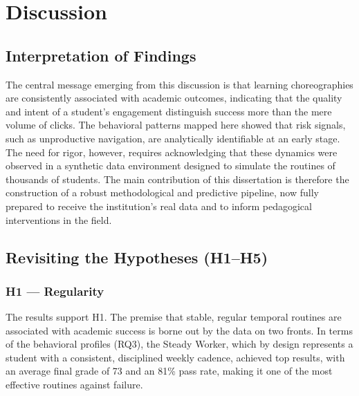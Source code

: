 \chapter{Discussion}
\label{chap:discussion}


\section{Interpretation of Findings}
\label{sec:interpretation}
The central message emerging from this discussion is that learning choreographies are consistently associated with academic outcomes, indicating that the quality and intent of a student's engagement distinguish success more than the mere volume of clicks. The behavioral patterns mapped here showed that risk signals, such as unproductive navigation, are analytically identifiable at an early stage. The need for rigor, however, requires acknowledging that these dynamics were observed in a synthetic data environment designed to simulate the routines of thousands of students. The main contribution of this dissertation is therefore the construction of a robust methodological and predictive pipeline, now fully prepared to receive the institution's real data and to inform pedagogical interventions in the field.

\section{Revisiting the Hypotheses (H1--H5)}
\label{sec:hypotheses-revisited}

\subsection{H1 --- Regularity}

The results support H1. The premise that stable, regular temporal routines are associated with academic success is borne out by the data on two fronts. In terms of the behavioral profiles (RQ3), the Steady Worker, which by design represents a student with a consistent, disciplined weekly cadence, achieved top results, with an average final grade of 73 and an 81\% pass rate, making it one of the most effective routines against failure.

